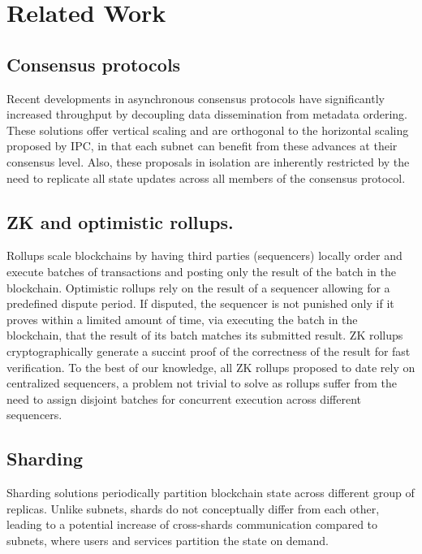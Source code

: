 \section{Related Work}
\label{sec:related-work}
    \subsection{Consensus protocols} Recent developments in asynchronous consensus protocols have significantly increased throughput by decoupling data dissemination from metadata ordering. These solutions offer vertical scaling and are orthogonal to the horizontal scaling proposed by IPC, in that each subnet can benefit from these advances at their consensus level. Also, these proposals in isolation are inherently restricted by the need to replicate all state updates across all members of the consensus protocol.
    
    \subsection{ZK and optimistic rollups.} Rollups scale blockchains by having third parties (sequencers) locally order and execute batches of transactions and posting only the result of the batch in the blockchain. Optimistic rollups rely on the result of a sequencer allowing for a predefined dispute period. If disputed, the sequencer is not punished only if it proves within a limited amount of time, via executing the batch in the blockchain, that the result of its batch matches its submitted result. ZK rollups cryptographically generate a succint proof of the correctness of the result for fast verification. To the best of our knowledge, all ZK rollups proposed to date rely on centralized sequencers, a problem not trivial to solve as rollups suffer from the need to assign disjoint batches for concurrent execution across different sequencers. 
    
    \subsection{Sharding} Sharding solutions periodically partition blockchain state across different group of replicas. Unlike subnets, shards do not conceptually differ from each other, leading to a potential increase of cross-shards communication compared to subnets, where users and services partition the state on demand. 
    
